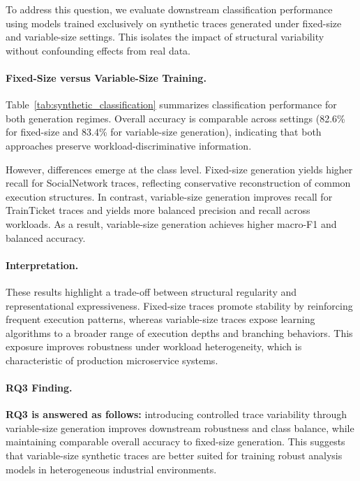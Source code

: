 \documentclass[sigconf,review]{acmart}
\begin{document}
To address this question, we evaluate downstream classification performance using models trained exclusively on synthetic traces generated under fixed-size and variable-size settings. This isolates the impact of structural variability without confounding effects from real data.

\paragraph{Fixed-Size versus Variable-Size Training.}
Table~\ref{tab:synthetic_classification} summarizes classification performance for both generation regimes. Overall accuracy is comparable across settings (82.6\% for fixed-size and 83.4\% for variable-size generation), indicating that both approaches preserve workload-discriminative information.

However, differences emerge at the class level. Fixed-size generation yields higher recall for SocialNetwork traces, reflecting conservative reconstruction of common execution structures. In contrast, variable-size generation improves recall for TrainTicket traces and yields more balanced precision and recall across workloads. As a result, variable-size generation achieves higher macro-F1 and balanced accuracy.

\paragraph{Interpretation.}
These results highlight a trade-off between structural regularity and representational expressiveness. Fixed-size traces promote stability by reinforcing frequent execution patterns, whereas variable-size traces expose learning algorithms to a broader range of execution depths and branching behaviors. This exposure improves robustness under workload heterogeneity, which is characteristic of production microservice systems.

\paragraph{RQ3 Finding.}
\textbf{RQ3 is answered as follows:} introducing controlled trace variability through variable-size generation improves downstream robustness and class balance, while maintaining comparable overall accuracy to fixed-size generation. This suggests that variable-size synthetic traces are better suited for training robust analysis models in heterogeneous industrial environments.
\end{document}
